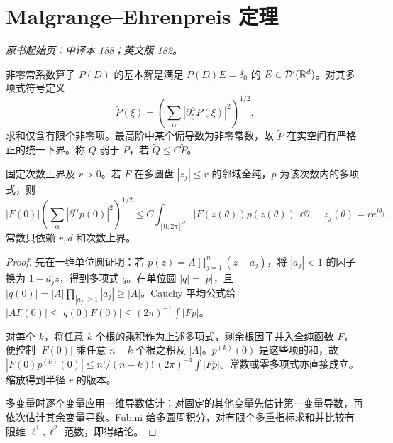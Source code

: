 \section{Malgrange--Ehrenpreis 定理}\label{sec:yosida-06-10}
\noindent\textit{原书起始页：中译本 188；英文版 182。}

\begin{definition}[基本解与符号强度]
非零常系数算子 $P(D)$ 的基本解是满足 $P(D)E=\delta_0$ 的 $E\in\mathcal{D}'(\mathbb R^d)$。对其多项式符号定义
\[
 \widetilde P(\xi)=\left(\sum_{\alpha}|\partial_\xi^\alpha P(\xi)|^2\right)^{1/2}.
\]
求和仅含有限个非零项。最高阶中某个偏导数为非零常数，故 $\widetilde P$ 在实空间有严格正的统一下界。称 $Q$ 弱于 $P$，若 $\widetilde Q\le C\widetilde P$。
\end{definition}

\begin{lemma}[多项式的复平均估计]\label{lem:y6-complex-average}
固定次数上界及 $r>0$。若 $F$ 在多圆盘 $|z_j|\le r$ 的邻域全纯，$p$ 为该次数内的多项式，则
\[
 |F(0)|\left(\sum_\alpha|\partial^\alpha p(0)|^2\right)^{1/2}
 \le C\int_{[0,2\pi]^d}|F(z(\theta))p(z(\theta))|\,\dd\theta,
 \quad z_j(\theta)=re^{i\theta_j}.
\]
常数只依赖 $r,d$ 和次数上界。
\end{lemma}
\begin{proof}
先在一维单位圆证明：若 $p(z)=A\prod_{j=1}^n(z-a_j)$，将 $|a_j|<1$ 的因子换为 $1-\overline{a_j}z$，得到多项式 $q$。在单位圆 $|q|=|p|$，且 $|q(0)|=|A|\prod_{|a_j|\ge1}|a_j|\ge|A|$。Cauchy 平均公式给
$|AF(0)|\le|q(0)F(0)|\le(2\pi)^{-1}\int|Fp|$。

对每个 $k$，将任意 $k$ 个根的乘积作为上述多项式，剩余根因子并入全纯函数 $F$，便控制 $|F(0)|$ 乘任意 $n-k$ 个根之积及 $|A|$。$p^{(k)}(0)$ 是这些项的和，故
$|F(0)p^{(k)}(0)|\le n!/(n-k)!\,(2\pi)^{-1}\int|Fp|$。常数或零多项式亦直接成立。缩放得到半径 $r$ 的版本。

多变量时逐个变量应用一维导数估计；对固定的其他变量先估计第一变量导数，再依次估计其余变量导数。Fubini 给多圆周积分，对有限个多重指标求和并比较有限维 $\ell^1,\ell^2$ 范数，即得结论。
\end{proof}

